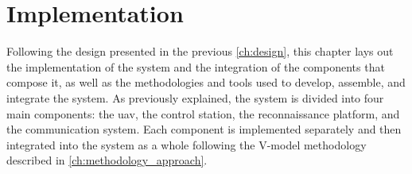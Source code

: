 \chapter{Implementation}\label{ch:implementation}

Following the design presented in the previous \cref{ch:design}, this chapter lays out the implementation of the system and the integration of the components that compose it, as well as the methodologies and tools used to develop, assemble, and integrate the system. As previously explained, the system is divided into four main components: the \gls{uav}, the control station, the reconnaissance platform, and the communication system. Each component is implemented separately and then integrated into the system as a whole following the V-model methodology described in \cref{ch:methodology_approach}.






